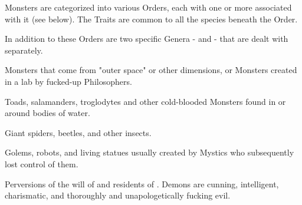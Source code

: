 
Monsters are categorized into various Orders, each with one or more  associated with it (see below).  The Traits are common to all the species beneath the Order.

In addition to these Orders are two specific Genera -  and  - that are dealt with separately.



Monsters that come from "outer space" or other dimensions, or Monsters created in a lab by fucked-up Philosophers.




Toads, salamanders, troglodytes and other cold-blooded Monsters found in or around bodies of water.  




Giant spiders, beetles, and other insects.



Golems, robots, and living statues usually created by Mystics who subsequently lost control of them.




Perversions of the will of \TheAuthority and residents of . Demons are cunning, intelligent, charismatic, and thoroughly and unapologetically fucking evil.

